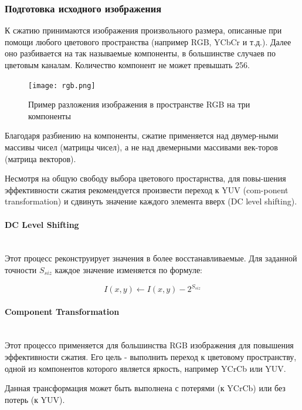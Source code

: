 \documentclass[a4paper]{article}
\begin{document}
  \subsubsection{Подготовка исходного изображения}

  К сжатию принимаются изображения произвольного размера, описанные при
  помощи любого цветового пространства (например RGB, YCbCr и т.д.).
  Далее оно разбивается на так называемые компоненты, в большинстве
  случаев по цветовым каналам. Количество компонент не может превышать 256.

  \begin{figure}[H]
    \centering
    \texttt{[image: rgb.png]}
    \caption{Пример разложения изображения в пространстве RGB на три компоненты}
  \end{figure}

  Благодаря разбиению на компоненты, сжатие применяется над двумер-ными массивы чисел (матрицы чисел),
  а не над двемерными массивами век-торов (матрица векторов).

  Несмотря на общую свободу выбора цветового простарнства, для повы-шения
  эффективности сжатия рекомендуется произвести переход к YUV (com-ponent transformation)
  и сдвинуть значение каждого элемента вверх (DC level shifting).

  \newpage
  \paragraph{DC Level Shifting}\mbox{}\\
  Этот процесс реконструирует значения в более восстанавливаемые. Для заданной точности
  $S_{siz}$ каждое значение изменяется по формуле:

  \begin{equation}
    I(x, y) \leftarrow I(x, y) - 2^{S_{siz}}
  \end{equation}

  \paragraph{Component Transformation}\mbox{}\\
  Этот процессо применяется для большинства RGB изображения для повышения
  эффективности сжатия. Его цель - выполнить переход к цветовому пространству,
  одной из компонентов которого является яркость, например YCrCb или YUV.

  Данная трансформация может быть выполнена с потерями (к YCrCb) или без потерь (к YUV).
\end{document}
